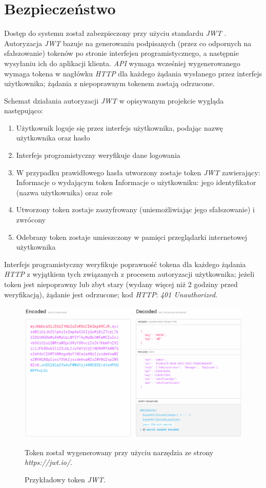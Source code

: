 \documentclass[eng,printmode,openany]{mgr}
\begin{document}
	\newpage
	\section{Bezpieczeństwo}
	Dostęp do systemu został zabezpieczony przy użyciu standardu \textit{JWT} \cite{jwt}. Autoryzacja \textit{JWT} bazuje na generowaniu podpisanych (przez co odpornych na sfałszowanie) tokenów po stronie interfejsu programistycznego, a następnie wysyłaniu ich do aplikacji klienta. \textit{API} wymaga wcześniej wygenerowanego wymaga tokena w nagłówku \textit{HTTP} dla każdego żądania wysłanego przez interfejs użytkownika; żądania z niepoprawnym tokenem zostają odrzucone.
	
	Schemat działania autoryzacji \textit{JWT} w opisywanym projekcie wygląda następująco:
	\begin{enumerate}
		\item Użytkownik loguje się przez interfejs użytkownika, podając nazwę użytkownika oraz hasło
		\item Interfejs programistyczny weryfikuje dane logowania
		\item W przypadku prawidłowego hasła utworzony zostaje token \textit{JWT} zawierający:
		\subitem Informacje o wydającym token
		\subitem Informacje o użytkowniku: jego identyfikator (nazwa użytkownika) oraz role
		\item Utworzony token zostaje zaszyfrowany (uniemożliwiając jego sfałszowanie) i zwrócony	
		\item Odebrany token zostaje umieszczony w pamięci przeglądarki internetowej użytkownika
	\end{enumerate}
	Interfejs programistyczny weryfikuje poprawność tokena dla każdego żądania \textit{HTTP} z wyjątkiem tych związanych z procesem autoryzacji użytkownika; jeżeli token jest niepoprawny lub zbyt stary (wydany więcej niż 2 godziny przed weryfikacją), żądanie jest odrzucone; kod \textit{HTTP}: \textit{401 Unauthorized}.
	
	\begin{figure}[H]
		\centering
		\includegraphics[width=\textwidth]{images/jwt.png}
		\caption{Przykładowy token \textit{JWT}.}
		\small 
		Token został wygenerowany przy użyciu narzędzia ze strony \textit{https://jwt.io/}.
	\end{figure}
	
\end{document}
